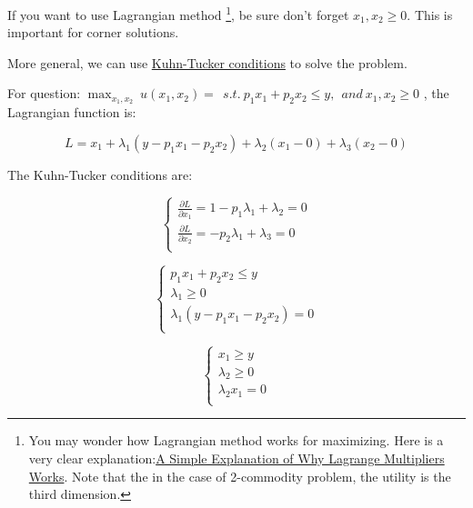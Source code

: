 \documentclass{article}
\begin{document}
\begin{mdframed}[backgroundcolor=blue!20,linecolor=white]

If you want to use Lagrangian method \footnote{You may wonder how Lagrangian method works for maximizing. Here is a very clear explanation:\href{https://medium.com/@andrew.chamberlain/a-simple-explanation-of-why-lagrange-multipliers-works-253e2cdcbf74\#:~:text=That\%20means\%20they're\%20parallel\%20and\%20point\%20in\%20the\%20same\%20direction.\&text=So\%20the\%20bottom\%20line\%20is,while\%20also\%20satisfying\%20those\%20constraints}{A Simple Explanation of Why Lagrange Multipliers Works}. Note that the in the case of 2-commodity problem, the utility is the third dimension.}, be sure don't forget $x_1, x_2 \ge 0$.
This is important for corner solutions.

More general, we can use \href{https://mjo.osborne.economics.utoronto.ca/index.php/tutorial/index/1/ktc/t}{Kuhn-Tucker conditions} to solve the problem.

For question: $\max_{x_1,x_2} \ u(x_1,x_2) =  \ \ s.t. \ p_1x_1 + p_2x_2 \le y,
\ \ and \ x_1, x_2 \ge 0 $ , the Lagrangian function is:

$$L = x_1 + \lambda_1(y - p_1x_1 - p_2x_2) + \lambda_2(x_1-0)+ \lambda_3(x_2-0)$$

The Kuhn-Tucker conditions are:

\begin{equation}
  \begin{cases}
    \frac{\partial L}{\partial x_1} = 1-p_1\lambda_1 + \lambda_2 =0 \\
    \frac{\partial L}{\partial x_2} = -p_2\lambda_1 + \lambda_3 =0 \\
  \end{cases}
  \label{eq:L1}
\end{equation}

\begin{equation}
  \begin{cases}
    p_1x_1 + p_2x_2 \le y \\
    \lambda_1 \ge 0 \\
    \lambda_1(y - p_1x_1 - p_2x_2) =0 \\
  \end{cases}
   \label{eq:L2}
\end{equation}

\begin{equation}
  \begin{cases}
    x_1 \ge y \\
    \lambda_2 \ge 0 \\
    \lambda_2 x_1 =0 \\
  \end{cases}
   \label{eq:L3}
\end{equation}


\end{mdframed}
\end{document}
